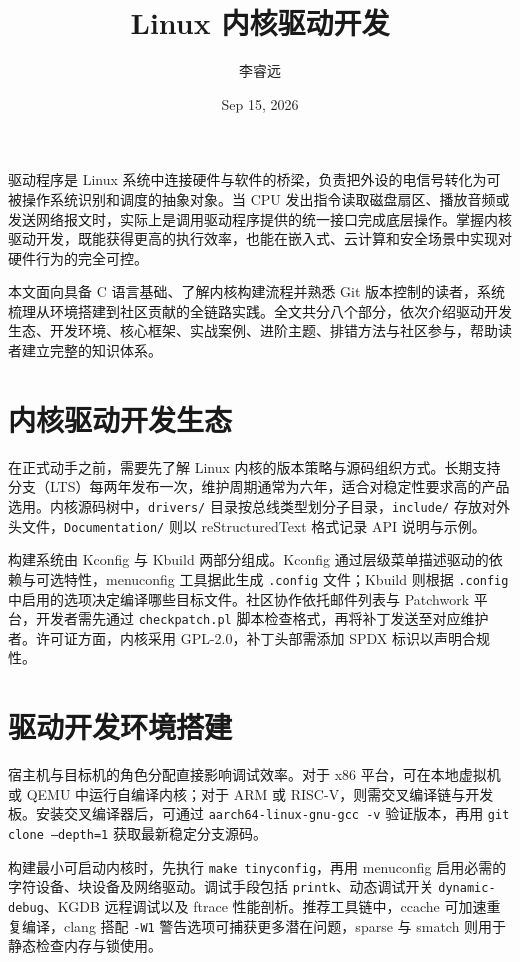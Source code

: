 \title{Linux 内核驱动开发}
\author{李睿远}
\date{Sep 15, 2026}
\maketitle
驱动程序是 Linux 系统中连接硬件与软件的桥梁，负责把外设的电信号转化为可被操作系统识别和调度的抽象对象。当 CPU 发出指令读取磁盘扇区、播放音频或发送网络报文时，实际上是调用驱动程序提供的统一接口完成底层操作。掌握内核驱动开发，既能获得更高的执行效率，也能在嵌入式、云计算和安全场景中实现对硬件行为的完全可控。\par
本文面向具备 C 语言基础、了解内核构建流程并熟悉 Git 版本控制的读者，系统梳理从环境搭建到社区贡献的全链路实践。全文共分八个部分，依次介绍驱动开发生态、开发环境、核心框架、实战案例、进阶主题、排错方法与社区参与，帮助读者建立完整的知识体系。\par
\chapter{内核驱动开发生态}
在正式动手之前，需要先了解 Linux 内核的版本策略与源码组织方式。长期支持分支（LTS）每两年发布一次，维护周期通常为六年，适合对稳定性要求高的产品选用。内核源码树中，\texttt{drivers/} 目录按总线类型划分子目录，\texttt{include/} 存放对外头文件，\texttt{Documentation/} 则以 reStructuredText 格式记录 API 说明与示例。\par
构建系统由 Kconfig 与 Kbuild 两部分组成。Kconfig 通过层级菜单描述驱动的依赖与可选特性，menuconfig 工具据此生成 \texttt{.config} 文件；Kbuild 则根据 \texttt{.config} 中启用的选项决定编译哪些目标文件。社区协作依托邮件列表与 Patchwork 平台，开发者需先通过 \texttt{checkpatch.pl} 脚本检查格式，再将补丁发送至对应维护者。许可证方面，内核采用 GPL-2.0，补丁头部需添加 SPDX 标识以声明合规性。\par
\chapter{驱动开发环境搭建}
宿主机与目标机的角色分配直接影响调试效率。对于 x86 平台，可在本地虚拟机或 QEMU 中运行自编译内核；对于 ARM 或 RISC-V，则需交叉编译链与开发板。安装交叉编译器后，可通过 \texttt{aarch64-linux-gnu-gcc -v} 验证版本，再用 \texttt{git clone --depth=1} 获取最新稳定分支源码。\par
构建最小可启动内核时，先执行 \texttt{make tinyconfig}，再用 menuconfig 启用必需的字符设备、块设备及网络驱动。调试手段包括 \texttt{printk}、动态调试开关 \texttt{dynamic-debug}、KGDB 远程调试以及 ftrace 性能剖析。推荐工具链中，ccache 可加速重复编译，clang 搭配 \texttt{-W1} 警告选项可捕获更多潜在问题，sparse 与 smatch 则用于静态检查内存与锁使用。\par
